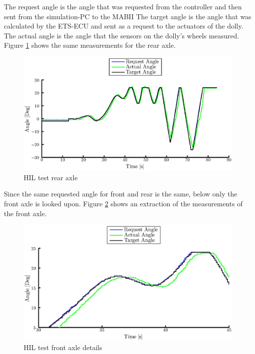 \documentclass[ExampleMasters.tex]{subfiles}
\begin{document}
The request angle is the angle that was requested from the controller and then sent from the simulation-PC to the \gls{MABII} The target angle is the angle that was calculated by the \gls{ETS}-\gls{ECU} and sent as a request to the actuators of the dolly. The actual angle is the angle that the sensors on the dolly's wheels measured.
Figure \ref{fig:HIL002_rear} shows the same measurements for the rear axle.

\begin{figure}[h]
	\centering
	\includegraphics[width=1\linewidth]{figures/HIL002_rear}
	\caption{HIL test rear axle}
	
	\label{fig:HIL002_rear}
\end{figure}
Since the same requested angle for front and rear is the same, below only the front axle is looked upon.
Figure \ref{fig:HIL002_front_closeup} shows an extraction of the measurements of the front axle.
\begin{figure}[h]
	\centering
	\includegraphics[width=1\linewidth]{figures/HIL002_front_closeup}
	\caption{\gls{HIL} test front axle details}
	
	\label{fig:HIL002_front_closeup}
\end{figure}
\end{document}
